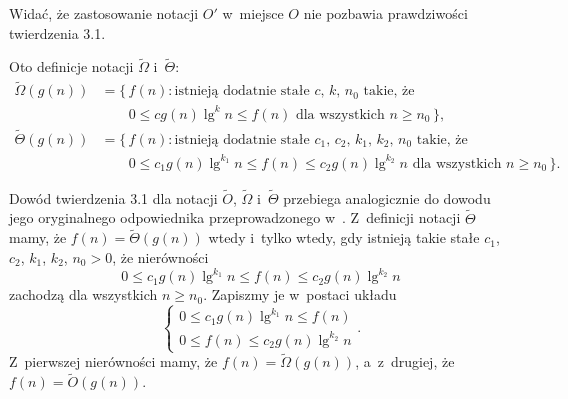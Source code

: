 Widać, że zastosowanie notacji $O'$ w~miejsce $O$ nie pozbawia prawdziwości twierdzenia 3.1.

\subproblem %
Oto definicje notacji $\widetilde{\Omega}$ i~$\widetilde{\Theta}$:
\[
	\begin{split}
		\widetilde{\Omega}(g(n)) &= \bigl\{\,f(n):\text{istnieją dodatnie stałe $c$, $k$, $n_0$ takie, że} \\
		&\qquad 0 \le cg(n)\lg^kn \le f(n) \text{ dla wszystkich $n \ge n_0$}\,\bigr\}, \\
		\widetilde{\Theta}(g(n)) &= \bigl\{\,f(n):\text{istnieją dodatnie stałe $c_1$, $c_2$, $k_1$, $k_2$, $n_0$ takie, że} \\
		&\qquad 0 \le c_1g(n)\lg^{k_1}n \le f(n) \le c_2g(n)\lg^{k_2}n \text{ dla wszystkich $n \ge n_0$}\,\bigr\}.
	\end{split}
\]

Dowód twierdzenia 3.1 dla notacji $\widetilde{O}$, $\widetilde{\Omega}$ i~$\widetilde{\Theta}$ przebiega analogicznie do dowodu jego oryginalnego odpowiednika przeprowadzonego w~.
Z~definicji notacji $\widetilde{\Theta}$ mamy, że $f(n)=\widetilde{\Theta}(g(n))$ wtedy i~tylko wtedy, gdy istnieją takie stałe $c_1$, $c_2$, $k_1$, $k_2$, $n_0>0$, że nierówności
\[
	0 \le c_1g(n)\lg^{k_1}n \le f(n) \le c_2g(n)\lg^{k_2}n
\]
zachodzą dla wszystkich $n\ge n_0$.
Zapiszmy je w~postaci układu
\[
	\begin{cases}
		0 \le c_1g(n)\lg^{k_1}n \le f(n) \\
		0 \le f(n) \le c_2g(n)\lg^{k_2}n
	\end{cases}.
\]
Z~pierwszej nierówności mamy, że $f(n)=\widetilde{\Omega}(g(n))$, a~z~drugiej, że $f(n)=\widetilde{O}(g(n))$.
